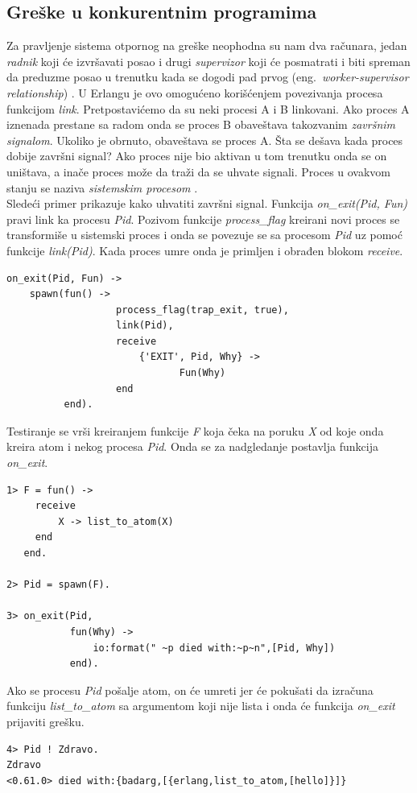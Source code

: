 \documentclass[a4paper]{article}
\begin{document}
\subsection{Greške u konkurentnim programima}
Za pravljenje sistema otpornog na greške neophodna su nam dva računara, 
jedan {\em radnik} koji će izvršavati posao i drugi {\em supervizor} 
koji će posmatrati i biti spreman da preduzme posao u trenutku kada se dogodi pad prvog  (eng.~{\em worker-supervisor relationship}) \cite{book_joe}. 
U Erlangu je ovo omogućeno korišćenjem povezivanja procesa funkcijom {\em link}. 
Pretpostavićemo da su neki procesi A i B  linkovani. 
Ako proces A iznenada prestane sa radom onda se proces B obaveštava takozvanim {\em završnim signalom}. 
Ukoliko je obrnuto, obaveštava se proces A. 
Šta se dešava kada proces dobije završni signal? 
Ako proces nije bio aktivan u tom trenutku onda se on uništava, 
a inače proces može da traži da se uhvate signali. Proces u ovakvom stanju se naziva {\em sistemskim procesom} \cite{book_joe}. \\

Sledeći primer prikazuje kako uhvatiti završni signal.
Funkcija {\em on\_exit(Pid, Fun) } pravi link ka procesu {\em Pid}. 
Pozivom funkcije {\em process\_flag} kreirani novi proces se transformiše u sistemski proces 
i onda se povezuje se sa procesom {\em Pid} uz pomoć funkcije {\em link(Pid)}. 
Kada proces umre onda je primljen i obrađen blokom {\em receive}.
\begin{verbatim} 
on_exit(Pid, Fun) ->	
    spawn(fun() ->    
                   process_flag(trap_exit, true),
                   link(Pid),
                   receive
                       {'EXIT', Pid, Why} ->
                              Fun(Why)
                   end
          end).
\end{verbatim}

Testiranje se vrši kreiranjem funkcije {\em F} 
koja čeka na poruku {\em X} od koje onda kreira atom i nekog procesa {\em Pid}. 
Onda se za nadgledanje postavlja funkcija {\em on\_exit}.
\begin{verbatim} 
1> F = fun() ->
     receive
         X -> list_to_atom(X)
     end
   end.

2> Pid = spawn(F).

3> on_exit(Pid,
           fun(Why) ->
               io:format(" ~p died with:~p~n",[Pid, Why])
           end).

\end{verbatim}

Ako se procesu {\em Pid} pošalje atom, on će umreti jer će pokušati da izračuna funkciju {\em list\_to\_atom} 
sa argumentom koji nije lista i onda će funkcija {\em on\_exit} prijaviti grešku.
\begin{verbatim} 
4> Pid ! Zdravo.
Zdravo
<0.61.0> died with:{badarg,[{erlang,list_to_atom,[hello]}]}
\end{verbatim}
\end{document}

